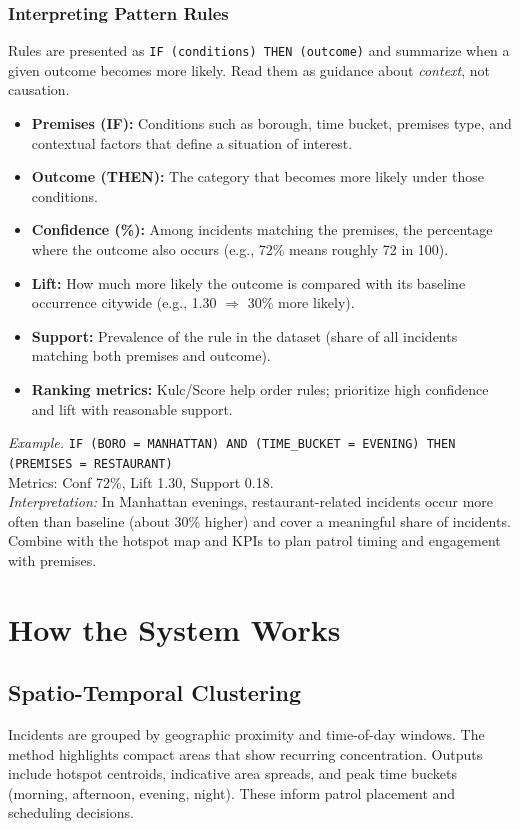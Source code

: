 \documentclass[11pt]{article}
\begin{document}
\subsubsection*{Interpreting Pattern Rules}
Rules are presented as \texttt{IF (conditions) THEN (outcome)} and summarize when a given outcome becomes more likely. Read them as guidance about \emph{context}, not causation.
\begin{itemize}[leftmargin=*]
  \item \textbf{Premises (IF):} Conditions such as borough, time bucket, premises type, and contextual factors that define a situation of interest.
  \item \textbf{Outcome (THEN):} The category that becomes more likely under those conditions.
  \item \textbf{Confidence (\%):} Among incidents matching the premises, the percentage where the outcome also occurs (e.g., 72\% means roughly 72 in 100).
  \item \textbf{Lift:} How much more likely the outcome is compared with its baseline occurrence citywide (e.g., 1.30 \(\Rightarrow\) 30\% more likely).
  \item \textbf{Support:} Prevalence of the rule in the dataset (share of all incidents matching both premises and outcome).
  \item \textbf{Ranking metrics:} Kulc/Score help order rules; prioritize high confidence and lift with reasonable support.
\end{itemize}

\noindent\textit{Example.}\; \texttt{IF (BORO = MANHATTAN) AND (TIME\_BUCKET = EVENING) THEN (PREMISES = RESTAURANT)}\\
\quad Metrics: Conf 72\%, Lift 1.30, Support 0.18.\\
\emph{Interpretation:} In Manhattan evenings, restaurant-related incidents occur more often than baseline (about 30\% higher) and cover a meaningful share of incidents. Combine with the hotspot map and KPIs to plan patrol timing and engagement with premises.

\section{How the System Works}

\subsection{Spatio-Temporal Clustering}
Incidents are grouped by geographic proximity and time-of-day windows. The method highlights compact areas that show recurring concentration. Outputs include hotspot centroids, indicative area spreads, and peak time buckets (morning, afternoon, evening, night). These inform patrol placement and scheduling decisions.
\end{document}
